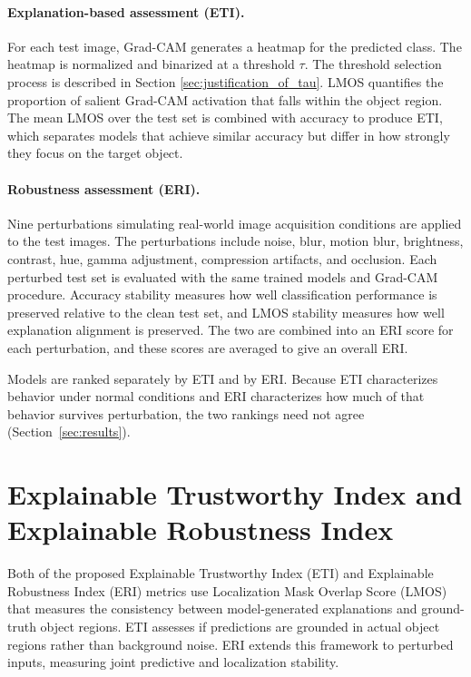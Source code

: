 \documentclass[a4paper,fleqn]{cas-dc}
\begin{document}
	\paragraph{Explanation-based assessment (ETI).} 
	For each test image, Grad-CAM generates a heatmap for the predicted class. 
	The heatmap is normalized and binarized at a threshold $\tau$. 
	The threshold selection process is described in Section \ref{sec:justification_of_tau}. %
	LMOS quantifies the proportion of salient Grad-CAM activation that falls within the
	object region. 
	The mean LMOS over the test set is combined with accuracy to produce ETI, which separates models that achieve similar accuracy but differ in how strongly they focus on the target object.
	
	\paragraph{Robustness assessment (ERI).} 
	Nine perturbations simulating real-world image acquisition conditions are applied to the test images. 
	The perturbations include noise, blur, motion blur, brightness, contrast, hue, gamma adjustment, compression artifacts, and occlusion. 
	Each perturbed test set is evaluated with the same trained models and Grad-CAM procedure. 
	Accuracy stability measures how well classification performance is preserved relative to the clean test set, and LMOS stability measures how well explanation alignment is preserved. 
	The two are combined into an ERI score for each perturbation, and these scores are averaged to give an overall ERI.
	
	Models are ranked separately by ETI and by ERI. 
	Because ETI characterizes
	behavior under normal conditions and ERI characterizes how much of that behavior survives perturbation, the two rankings need not agree (Section~\ref{sec:results}).
	
	\section{Explainable Trustworthy Index and Explainable Robustness Index}
	\label{sec:proposed_method}
	Both of the proposed Explainable Trustworthy Index (ETI) and Explainable Robustness Index (ERI) metrics use Localization Mask Overlap Score (LMOS) that measures the consistency between model-generated explanations and ground-truth object regions. 
	ETI assesses if predictions are grounded in actual object regions rather than background noise. 
	ERI extends this framework to perturbed inputs, measuring joint predictive and localization stability.
	
\end{document}
